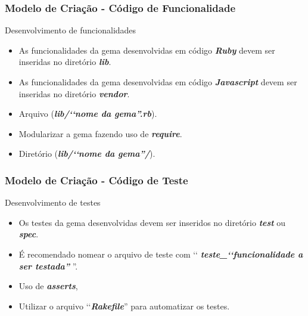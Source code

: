 \begin{frame}
\frametitle{Modelo de Criação - Código de Funcionalidade}

  \begin{block}{Desenvolvimento de funcionalidades}

   \begin{itemize}

    \item As funcionalidades da gema desenvolvidas em código \emph{\textbf{Ruby}} devem ser inseridas no
    diretório \emph{\textbf{lib}}.

    \item As funcionalidades da gema desenvolvidas em código \emph{\textbf{Javascript}} devem ser inseridas no
    diretório \emph{\textbf{vendor}}.

    \item Arquivo (\emph{\textbf{lib/‘‘nome da gema''.rb}}).

    \item Modularizar a gema fazendo uso de \emph{\textbf{require}}.

    \item Diretório (\emph{\textbf{lib/‘‘nome da gema''/}}).

   \end{itemize}

  \end{block}

\end{frame}


\begin{frame}
\frametitle{Modelo de Criação - Código de Teste}

   \begin{block}{Desenvolvimento de testes}

   \begin{itemize}

    \item Os testes da gema desenvolvidas devem ser inseridos no diretório \emph{\textbf{test}} ou
    \emph{\textbf{spec}}.

    \item É recomendado nomear o arquivo de teste com ‘‘ \emph{\textbf{teste\_‘‘funcionalidade a ser testada''}} ''.

    \item Uso de \emph{\textbf{asserts}},

    \item Utilizar o arquivo ‘‘\emph{\textbf{Rakefile}}'' para automatizar os testes.

   \end{itemize}

  \end{block}

\end{frame}


